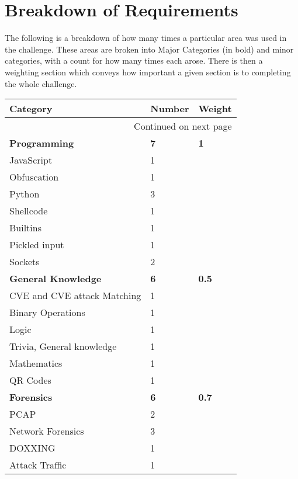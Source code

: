 \documentclass[a4paper,11pt]{report}
\begin{document}
	\section{Breakdown of Requirements}
	 	The following is a breakdown of how many times a particular area was used in the challenge. 
		These areas are broken into Major Categories (in bold) and minor categories, with a count for how many times each arose. 
		There is then a weighting section which conveys how important a given section is to completing the whole challenge. 
		\begin{center}
			\begin{longtable}{| l | l | l |}
				\hline
				\textbf{Category} & \textbf{Number} & \textbf{Weight} \\ \hline 
				\endhead
				\multicolumn{3}{|r|}{{Continued on next page}} \\ \hline
				\endfoot
				\endlastfoot
				\textbf{Programming} & \textbf{7} & \textbf{1} \\ \hline
				\quad JavaScript & 1 & \\ \hline 
				\quad Obfuscation & 1 & \\ \hline
				\quad Python & 3 & \\ \hline 
				\qquad Shellcode & 1 & \\ \hline 
				\qquad Builtins & 1 & \\ \hline 
				\qquad Pickled input & 1 & \\ \hline 
				\quad Sockets & 2 & \\ \hline 
				\textbf{General Knowledge} & \textbf{6} & \textbf{0.5}\\ \hline 
				\quad CVE and CVE attack Matching & 1 & \\ \hline 
				\quad Binary Operations & 1 & \\ \hline 
				\quad Logic & 1 & \\ \hline 
				\quad Trivia, General knowledge & 1 & \\ \hline 
				\quad Mathematics & 1 & \\ \hline 
				\quad QR Codes & 1 & \\ \hline 
				\textbf{Forensics} & \textbf{6} & \textbf{0.7}\\ \hline
				\quad PCAP & 2 & \\ \hline
				\quad Network Forensics & 3 & \\ \hline 
				\quad DOXXING & 1 & \\ \hline 
				\quad Attack Traffic & 1 & \\ \hline 

\end{longtable}
\end{center}
\end{document}
